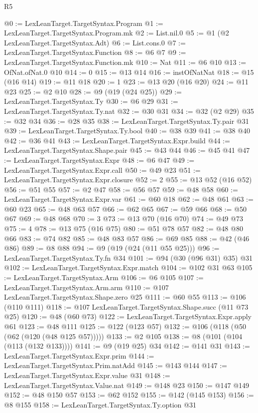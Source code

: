 \begin{lexlean}{R5}
\begin{coremodule}
{{{{{{{{{@0 := LexLeanTarget.TargetSyntax.Program
@1 := LexLeanTarget.TargetSyntax.Program.mk
@2 := List.nil.{0}
@5 := @1 (@2 LexLeanTarget.TargetSyntax.Adt)
@6 := List.cons.{0}
@7 := LexLeanTarget.TargetSyntax.Function
@8 := @6 @7
@9 := LexLeanTarget.TargetSyntax.Function.mk
@10 := Nat
@11 := @6 @10
@13 := OfNat.ofNat.{0} @10
@14 := 0
@15 := @13 @14
@16 := instOfNatNat
@18 := @15 (@16 @14)
@19 := @11 @18
@20 := 1
@23 := @13 @20 (@16 @20)
@24 := @11 @23
@25 := @2 @10
@28 := @9 (@19 (@24 @25))
@29 := LexLeanTarget.TargetSyntax.Ty
@30 := @6 @29
@31 := LexLeanTarget.TargetSyntax.Ty.nat
@32 := @30 @31
@34 := @32 (@2 @29)
@35 := @32 @34
@36 := @28 @35
@38 := LexLeanTarget.TargetSyntax.Ty.pair @31
@39 := LexLeanTarget.TargetSyntax.Ty.bool
@40 := @38 @39
@41 := @38 @40
@42 := @36 @41
@43 := LexLeanTarget.TargetSyntax.Expr.build
@44 := LexLeanTarget.TargetSyntax.Shape.pair
@45 := @43 @44
@46 := @45 @41
@47 := LexLeanTarget.TargetSyntax.Expr
@48 := @6 @47
@49 := LexLeanTarget.TargetSyntax.Expr.call
@50 := @49 @23
@51 := LexLeanTarget.TargetSyntax.Expr.closure
@52 := 2
@55 := @13 @52 (@16 @52)
@56 := @51 @55
@57 := @2 @47
@58 := @56 @57
@59 := @48 @58
@60 := LexLeanTarget.TargetSyntax.Expr.var
@61 := @60 @18
@62 := @48 @61
@63 := @60 @23
@65 := @48 @63 @57
@66 := @62 @65
@67 := @59 @66
@68 := @50 @67
@69 := @48 @68
@70 := 3
@73 := @13 @70 (@16 @70)
@74 := @49 @73
@75 := 4
@78 := @13 @75 (@16 @75)
@80 := @51 @78 @57
@82 := @48 @80 @66
@83 := @74 @82
@85 := @48 @83 @57
@86 := @69 @85
@88 := @42 (@46 @86)
@89 := @8 @88
@94 := @9 (@19 (@24 (@11 @55 @25)))
@96 := LexLeanTarget.TargetSyntax.Ty.fn @34
@101 := @94 (@30 (@96 @31) @35) @31
@102 := LexLeanTarget.TargetSyntax.Expr.match
@104 := @102 @31 @63
@105 := LexLeanTarget.TargetSyntax.Arm
@106 := @6 @105
@107 := LexLeanTarget.TargetSyntax.Arm.arm
@110 := @107 LexLeanTarget.TargetSyntax.Shape.zero @25
@111 := @60 @55
@113 := @106 (@110 @111)
@118 := @107 LexLeanTarget.TargetSyntax.Shape.succ (@11 @73 @25)
@120 := @48 (@60 @73)
@122 := LexLeanTarget.TargetSyntax.Expr.apply @61
@123 := @48 @111
@125 := @122 (@123 @57)
@132 := @106 (@118 (@50 (@62 (@120 (@48 @125 @57)))))
@133 := @2 @105
@138 := @8 (@101 (@104 (@113 (@132 @133))))
@141 := @9 (@19 @25) @34
@142 := @141 @31
@143 := LexLeanTarget.TargetSyntax.Expr.prim
@144 := LexLeanTarget.TargetSyntax.Prim.natAdd
@145 := @143 @144
@147 := LexLeanTarget.TargetSyntax.Expr.value @31
@148 := LexLeanTarget.TargetSyntax.Value.nat
@149 := @148 @23
@150 := @147 @149
@152 := @48 @150 @57
@153 := @62 @152
@155 := @142 (@145 @153)
@156 := @8 @155
@158 := LexLeanTarget.TargetSyntax.Ty.option @31
}}}}}}}}}
\end{coremodule}
\end{lexlean}
